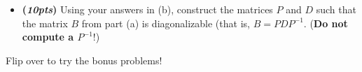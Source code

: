 \documentclass[12pt]{article}%
\begin{document}
\begin{enumerate}
\begin{itemize}
\begin{itemize}
        \item[iii)]  \(\vec{v_3}=\begin{bmatrix}-2\\ -1\\ \;\;1\end{bmatrix}\)
        \vspace{3cm}
        \item [iv)] \(\vec{v_4}=\begin{bmatrix}1\\-\sqrt{2}\\1\end{bmatrix}\)
        \vspace{3cm}
        \item [v)] \(\vec{v_5}=\begin{bmatrix}1\\ 6\\16\end{bmatrix}\)
    \end{itemize}
    
    \vspace{5cm}
    
    \item[b)] \textbf{(\emph{10pts})} Using your answers in (b), construct the matrices \(P\) and \(D\) such that the matrix \(B\) from part (a) is diagonalizable (that is, \(B=PDP^{-1}\).
     (\textbf{Do not compute a \(P^{-1}\)}!)
    \end{itemize}
\end{enumerate}

\vfill

\begin{center}
    Flip over to try the bonus problems!
\end{center}
\newpage
\end{document}
